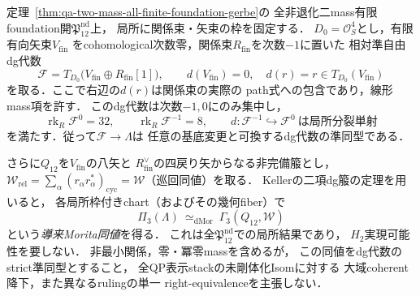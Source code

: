 \begin{proposition}[非最小二massの二段準自由dg解消とGinzburg比較]
\label{prop:qa-q12-semifree-ginzburg-morita}
定理~\ref{thm:qa-two-mass-all-finite-foundation-gerbe}の
全非退化二mass有限foundation開$\mathfrak P_{12}^{\mathrm{nd}}$上，
局所に関係束・矢束の枠を固定する．
$D_0=\mathcal O_S^4$とし，有限有向矢束$V_{\mathrm{fin}}$
をcohomological次数零，関係束$R_{\mathrm{fin}}$を次数$-1$に置いた
相対準自由dg代数
\[
 \mathscr F=T_{D_0}
   \bigl(V_{\mathrm{fin}}\oplus R_{\mathrm{fin}}[1]\bigr),
 \qquad d(V_{\mathrm{fin}})=0,\quad d(r)=r\in T_{D_0}(V_{\mathrm{fin}})
 \tag{SF}\label{eq:qa-q12-semifree-dg-presentation}
\]
を取る．ここで右辺の$d(r)$は関係束の実際の
path式への包含であり，線形mass項を許す．
このdg代数は次数$-1,0$にのみ集中し，
\[
 \operatorname{rk}_R\mathscr F^0=32,\qquad
 \operatorname{rk}_R\mathscr F^{-1}=8,\qquad
 d:\mathscr F^{-1}\hookrightarrow\mathscr F^0
 \ \text{は局所分裂単射}
 \tag{SFR}\label{eq:qa-q12-semifree-ranks}
\]
を満たす．従って$\mathscr F\to\Lambda$は
任意の基底変更と可換するdg代数の準同型である．

さらに$Q_{12}$を$V_{\mathrm{fin}}$の八矢と
$R_{\mathrm{fin}}^\vee$の四戻り矢からなる非完備箙とし，
$\mathcal W_{\mathrm{rel}}=\sum_\alpha
 (r_\alpha r_\alpha^*)_{\mathrm{cyc}}
 =\mathcal W$（巡回同値）を取る．
Kellerの二項dg箙の定理を用いると，
各局所枠付きchart（およびその幾何fiber）で
\[
 \boxed{\quad
 \Pi_3(\Lambda)\ \simeq_{\mathrm{dMor}}\
 \Gamma_3(Q_{12},\mathcal W)
 \quad}
 \tag{GM3}\label{eq:qa-q12-local-ginzburg-dg-morita}
\]
という\emph{導来Morita同値}を得る．
これは全$\mathfrak P_{12}^{\mathrm{nd}}$での局所結果であり，
$H_2$実現可能性を要しない．
非最小関係，零・冪零massを含めるが，
この同値をdg代数のstrict準同型とすること，
全QP表示stackの未剛体化Isomに対する
大域coherent降下，また異なるrulingの単一
right-equivalenceを主張しない．
\end{proposition}

